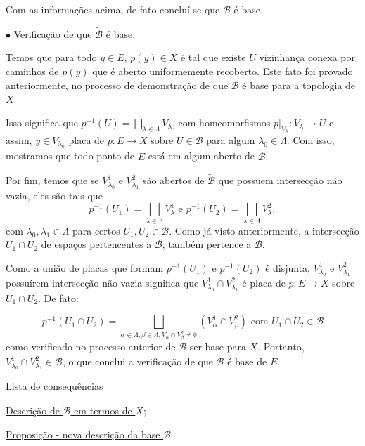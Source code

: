 \begin{dem}
    Com as informações acima, de fato concluí-se que $\mathcal{B}$ é base.\newline
    
    $\bullet$ Verificação de que $\tilde{\mathcal{B}}$ é base:\newline
    
    Temos que para todo $y\in E$, $p(y)\in X$ é tal que existe $U$ vizinhança conexa por caminhos de $p(y)$ que é aberto uniformemente recoberto. Este fato foi provado anteriormente, no processo de demonstração de que $\mathcal{B}$ é base para a topologia de $X$.
    
    Isso significa que $p^{-1}(U)=\underset{\lambda\in \Lambda}{\bigsqcup } V_\lambda$, com homeomorfismos $p|_{V_\lambda}: V_\lambda  \rightarrow U$ e assim, $y\in V_{\lambda_0}$ placa de $p:E\rightarrow X$ sobre $U\in \mathcal{B}$ para algum $ \lambda_0\in \Lambda.$
    Com isso, mostramos que todo ponto de $E$ está em algum aberto de $\tilde{\mathcal{B}}.$\newline


    Por fim, temos que se $V^1_{\lambda_0}$ e $V^2_{\lambda_1}$ são abertos de $\tilde{\mathcal{B}}$ que possuem intersecção não vazia, eles são tais que $$p^{-1}(U_1)=\underset{\lambda\in \Lambda}{\bigsqcup } V_\lambda^1\text{ e }p^{-1}(U_2)=\underset{\lambda\in \Lambda}{\bigsqcup } V_\lambda^2,$$ com $\lambda_0, \lambda_1 \in \Lambda$ para certos $U_1,U_2\in \mathcal{B}$. Como já visto anteriormente, a intersecção $U_1\cap U_2$ de espaços pertencentes a $\mathcal{B}$, também pertence a $\mathcal{B}$.

    Como a união de placas que formam $p^{-1}(U_1)$ e $p^{-1}(U_2)$ é disjunta, $V^1_{\lambda_0}$ e $V^2_{\lambda_1}$ possuírem intersecção não vazia significa que $V^1_{\lambda_0}\cap V^2_{\lambda_1}$ é placa de $p:E\rightarrow X$ sobre $U_1\cap U_2$. De fato:

    
    $$p^{-1}(U_1\cap U_2)=\underset{\alpha\in \Lambda, \beta \in \Lambda, V^1_\alpha \cap V^2_\beta\ne \emptyset}{\bigsqcup } (V^1_\alpha \cap V^2_\beta)\text{ com }U_1\cap U_2\in \mathcal{B}$$ como verificado no processo anterior de $\mathcal{B}$ ser base para $X$. Portanto, $V^1_{\lambda_0}\cap V^2_{\lambda_1}\in \tilde{\mathcal{B}}$, o que conclui a verificação de que $\tilde{\mathcal{B}}$ é base de $E$.
\end{dem}



\begin{titlemize}{Lista de consequências}
	\item \hyperref[descrição-da-base-do-recobrimento-prop]{Descrição de $\tilde{\mathcal{B}}$ em termos de $X$};\\ %
	\item \hyperref[pertence-a-base-se-e-somente-se-possui-i-trivial]{Proposição - nova descrição da base $\mathcal{B}$}
\end{titlemize}








